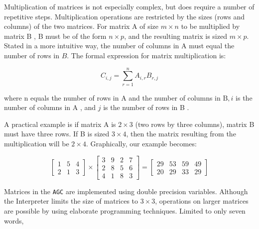 \documentclass[refcap, oxford]{ahsan}
\begin{document}
Multiplication of matrices is not especially complex, but does require a number of repetitive steps. Multiplication operations are restricted by the sizes (rows and columns) of the two matrices. For matrix A of size $m \times n$ to be multiplied by matrix B , B must be of the form $n \times p$, and the resulting matrix is sized $m \times p$. Stated in a more intuitive way, the number of columns in A must equal the number of rows in $B$. The formal expression for matrix multiplication is:

$$
C_{i, j}=\sum_{r=1}^{n} A_{i, r} B_{r, j}
$$

where n equals the number of rows in A and the number of columns in $\mathrm{B}, i$ is the number of columns in A , and $j$ is the number of rows in B .

A practical example is if matrix A is $2 \times 3$ (two rows by three columns), matrix B must have three rows. If B is sized $3 \times 4$, then the matrix resulting from the multiplication will be $2 \times 4$. Graphically, our example becomes:

$$
\left[\begin{array}{lll}
1 & 5 & 4 \\
2 & 1 & 3
\end{array}\right] \times\left[\begin{array}{llll}
3 & 9 & 2 & 7 \\
2 & 8 & 5 & 6 \\
4 & 1 & 8 & 3
\end{array}\right]=\left[\begin{array}{cccc}
29 & 53 & 59 & 49 \\
20 & 29 & 33 & 29
\end{array}\right]
$$

Matrices in the \texttt{AGC} are implemented using double precision variables. Although the Interpreter limits the size of matrices to $3 \times 3$, operations on larger matrices are possible by using elaborate programming techniques. Limited to only seven words,

\end{document}
